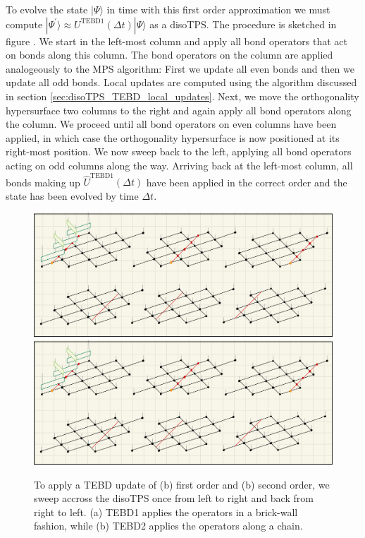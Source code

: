 To evolve the state $|\Psi\rangle$ in time with this first order approximation we must compute $|\Psi^\prime\rangle \approx U^\text{TEBD1}(\Delta t)|\Psi\rangle$ as a disoTPS. The procedure is sketched in figure . We start in the left-most column and apply all bond operators that act on bonds along this column. The bond operators on the column are applied analogeously to the MPS algorithm: First we update all even bonds and then we update all odd bonds. Local updates are computed using the algorithm discussed in section \ref{sec:disoTPS_TEBD_local_updates}. Next, we move the orthogonality hypersurface two columns to the right and again apply all bond operators along the column. We proceed until all bond operators on even columns have been applied, in which case the orthogonality hypersurface is now positioned at its right-most position. We now sweep back to the left, applying all bond operators acting on odd columns along the way. Arriving back at the left-most column, all bonds making up $\hat{U}^\text{TEBD1}(\Delta t)$ have been applied in the correct order and the state has been evolved by time $\Delta t$. \par
\begin{figure}
	\centering
	\subcaptionbox{\label{fig:disoTPS_TEBD_global_update_applying_TEBD1}}
	{%
		\includegraphics[width=1.0\textwidth]{figures/disoTPS/disoTPS_TEBD1_global_update.jpeg}
	}
	\subcaptionbox{\label{fig:disoTPS_TEBD_global_update_applying_TEBD2}}
	{%
		\includegraphics[width=1.0\textwidth]{figures/disoTPS/disoTPS_TEBD1_global_update.jpeg}
	}
	\caption{To apply a TEBD update of (b) first order and (b) second order, we sweep accross the disoTPS once from left to right and back from right to left. (a) TEBD1 applies the operators in a brick-wall fashion, while (b) TEBD2 applies the operators along a chain. }
	\label{fig:disoTPS_TEBD_global_update_applying_TEBD}
\end{figure}
